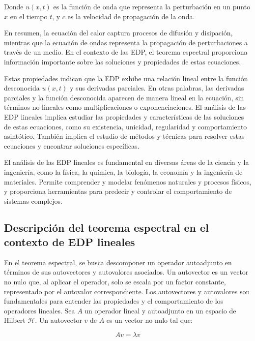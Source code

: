 \documentclass{article}
\begin{document}
        Donde $u(x,t)$ es la función de onda que representa la perturbación en un punto $x$ en el tiempo $t$, y $c$ es la velocidad de propagación de la onda.



    En resumen, la ecuación del calor captura procesos de difusión y disipación, mientras que la ecuación de ondas representa la propagación de perturbaciones a través de un medio. En el contexto de las EDP, el teorema espectral proporciona información importante sobre las soluciones y propiedades de estas ecuaciones.



    Estas propiedades indican que la EDP exhibe una relación lineal entre la función desconocida $u(x, t)$ y sus derivadas parciales. En otras palabras, las derivadas parciales y la función desconocida aparecen de manera lineal en la ecuación, sin términos no lineales como multiplicaciones o exponenciaciones.
    El análisis de las EDP lineales implica estudiar las propiedades y características de las soluciones de estas ecuaciones, como su existencia, unicidad, regularidad y comportamiento asintótico. También implica el estudio de métodos y técnicas para resolver estas ecuaciones y encontrar soluciones específicas.

    El análisis de las EDP lineales es fundamental en diversas áreas de la ciencia y la ingeniería, como la física, la química, la biología, la economía y la ingeniería de materiales. Permite comprender y modelar fenómenos naturales y procesos físicos, y proporciona herramientas para predecir y controlar el comportamiento de sistemas complejos.
    \subsection{Descripción del teorema espectral en el contexto de EDP lineales}
    En el teorema espectral, se busca descomponer un operador autoadjunto en términos de sus autovectores y autovalores asociados. Un autovector es un vector no nulo que, al aplicar el operador, solo se escala por un factor constante, representado por el autovalor correspondiente. Los autovectores y autovalores son fundamentales para entender las propiedades y el comportamiento de los operadores lineales.
    Sea $A$ un operador lineal y autoadjunto en un espacio de Hilbert $\mathcal{H}$. Un autovector $v$ de $A$ es un vector no nulo tal que:

    \begin{equation}
    Av = \lambda v
    \end{equation}
    
\end{document}

